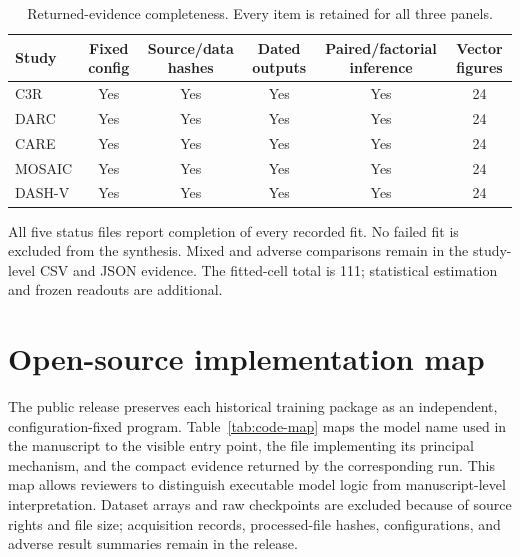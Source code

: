 \documentclass[10pt]{article}
\begin{document}
\begin{table}[H]
\centering
\small
\caption{Returned-evidence completeness. Every item is retained for all three panels.}
\begin{tabular}{lccccc}
\toprule
Study & Fixed config & Source/data hashes & Dated outputs & Paired/factorial inference & Vector figures \\
\midrule
C3R & Yes & Yes & Yes & Yes & 24 \\
DARC & Yes & Yes & Yes & Yes & 24 \\
CARE & Yes & Yes & Yes & Yes & 24 \\
MOSAIC & Yes & Yes & Yes & Yes & 24 \\
DASH-V & Yes & Yes & Yes & Yes & 24 \\
\bottomrule
\end{tabular}
\end{table}

All five status files report completion of every recorded fit. No failed fit is
excluded from the synthesis. Mixed and adverse comparisons remain in the
study-level CSV and JSON evidence. The fitted-cell total is 111; statistical
estimation and frozen readouts are additional.

\section{Open-source implementation map}

The public release preserves each historical training package as an independent,
configuration-fixed program. Table~\ref{tab:code-map} maps the model name used in
the manuscript to the visible entry point, the file implementing its principal
mechanism, and the compact evidence returned by the corresponding run. This map
allows reviewers to distinguish executable model logic from manuscript-level
interpretation. Dataset arrays and raw checkpoints are excluded because of source
rights and file size; acquisition records, processed-file hashes, configurations,
and adverse result summaries remain in the release.
\end{document}

